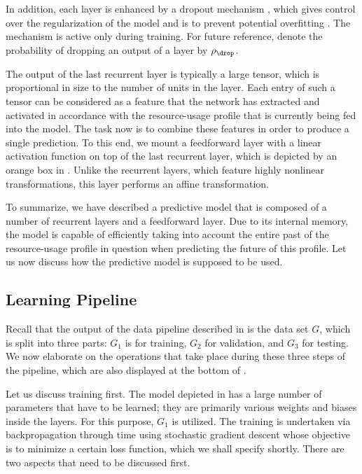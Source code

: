 In addition, each layer is enhanced by a dropout mechanism \cite{zaremba2014},
which gives control over the regularization of the model and is to prevent
potential overfitting \cite{hastie2013}. The mechanism is active only during
training. For future reference, denote the probability of dropping an output of
a layer by $\rho_\drop$.

The output of the last recurrent layer is typically a large tensor, which is
proportional in size to the number of units in the layer. Each entry of such a
tensor can be considered as a feature that the network has extracted and
activated in accordance with the resource-usage profile that is currently being
fed into the model. The task now is to combine these features in order to
produce a single prediction. To this end, we mount a feedforward layer with a
linear activation function on top of the last recurrent layer, which is depicted
by an orange box in . Unlike the recurrent layers,
which feature highly nonlinear transformations, this layer performs an affine
transformation.

To summarize, we have described a predictive model that is composed of a number
of recurrent layers and a feedforward layer. Due to its internal memory, the
model is capable of efficiently taking into account the entire past of the
resource-usage profile in question when predicting the future of this profile.
Let us now discuss how the predictive model is supposed to be used.

\subsection{Learning Pipeline}

Recall that the output of the data pipeline described in
 is the data set $G$, which is split into three parts:
$G_1$ is for training, $G_2$ for validation, and $G_3$ for testing. We now
elaborate on the operations that take place during these three steps of the
pipeline, which are also displayed at the bottom of .

Let us discuss training first. The model depicted in
 has a large number of parameters that have to be
learned; they are primarily various weights and biases inside the layers. For
this purpose, $G_1$ is utilized. The training is undertaken via backpropagation
through time using stochastic gradient descent \cite{goodfellow2016} whose
objective is to minimize a certain loss function, which we shall specify
shortly. There are two aspects that need to be discussed first.

